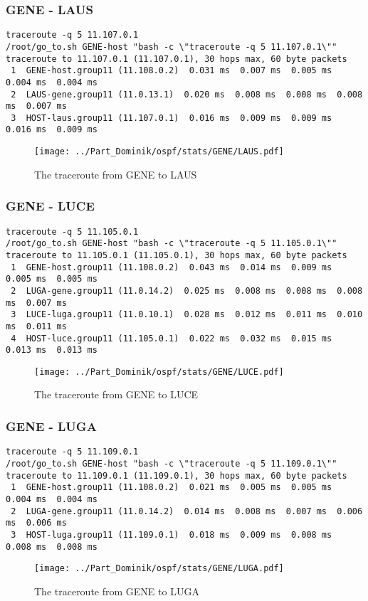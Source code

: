 \subsubsection{GENE - LAUS}
\begin{lstlisting}
traceroute -q 5 11.107.0.1
/root/go_to.sh GENE-host "bash -c \"traceroute -q 5 11.107.0.1\""
traceroute to 11.107.0.1 (11.107.0.1), 30 hops max, 60 byte packets
 1  GENE-host.group11 (11.108.0.2)  0.031 ms  0.007 ms  0.005 ms  0.004 ms  0.004 ms
 2  LAUS-gene.group11 (11.0.13.1)  0.020 ms  0.008 ms  0.008 ms  0.008 ms  0.007 ms
 3  HOST-laus.group11 (11.107.0.1)  0.016 ms  0.009 ms  0.009 ms  0.016 ms  0.009 ms
\end{lstlisting}
\begin{figure}[H]
\centering
\texttt{[image: ../Part\_Dominik/ospf/stats/GENE/LAUS.pdf]}
\caption{The traceroute from GENE to LAUS}
\end{figure}
\clearpage
\subsubsection{GENE - LUCE}
\begin{lstlisting}
traceroute -q 5 11.105.0.1
/root/go_to.sh GENE-host "bash -c \"traceroute -q 5 11.105.0.1\""
traceroute to 11.105.0.1 (11.105.0.1), 30 hops max, 60 byte packets
 1  GENE-host.group11 (11.108.0.2)  0.043 ms  0.014 ms  0.009 ms  0.005 ms  0.005 ms
 2  LUGA-gene.group11 (11.0.14.2)  0.025 ms  0.008 ms  0.008 ms  0.008 ms  0.007 ms
 3  LUCE-luga.group11 (11.0.10.1)  0.028 ms  0.012 ms  0.011 ms  0.010 ms  0.011 ms
 4  HOST-luce.group11 (11.105.0.1)  0.022 ms  0.032 ms  0.015 ms  0.013 ms  0.013 ms
\end{lstlisting}
\begin{figure}[H]
\centering
\texttt{[image: ../Part\_Dominik/ospf/stats/GENE/LUCE.pdf]}
\caption{The traceroute from GENE to LUCE}
\end{figure}
\clearpage
\subsubsection{GENE - LUGA}
\begin{lstlisting}
traceroute -q 5 11.109.0.1
/root/go_to.sh GENE-host "bash -c \"traceroute -q 5 11.109.0.1\""
traceroute to 11.109.0.1 (11.109.0.1), 30 hops max, 60 byte packets
 1  GENE-host.group11 (11.108.0.2)  0.021 ms  0.005 ms  0.005 ms  0.004 ms  0.004 ms
 2  LUGA-gene.group11 (11.0.14.2)  0.014 ms  0.008 ms  0.007 ms  0.006 ms  0.006 ms
 3  HOST-luga.group11 (11.109.0.1)  0.018 ms  0.009 ms  0.008 ms  0.008 ms  0.008 ms
\end{lstlisting}
\begin{figure}[H]
\centering
\texttt{[image: ../Part\_Dominik/ospf/stats/GENE/LUGA.pdf]}
\caption{The traceroute from GENE to LUGA}
\end{figure}
\clearpage
